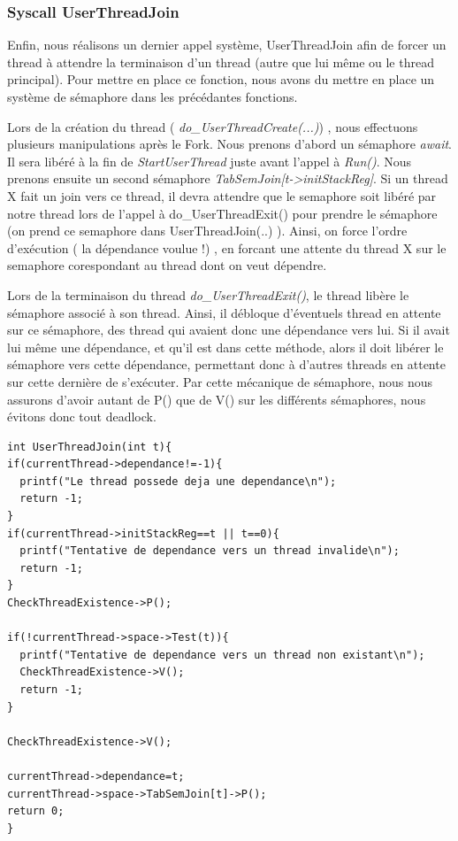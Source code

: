 \documentclass[a4paper,10pt]{article}
\begin{document}
\subsubsection{Syscall UserThreadJoin}
Enfin, nous réalisons un dernier appel système, UserThreadJoin afin de forcer un thread à attendre la terminaison d'un thread (autre que lui même ou le thread principal).
Pour mettre en place ce fonction, nous avons du mettre en place un système de sémaphore dans les précédantes fonctions.

Lors de la création du thread ( \textit{do\_UserThreadCreate(...)}) , nous effectuons plusieurs manipulations  après le Fork. Nous prenons d'abord un sémaphore \textit{await}.
Il sera libéré à la fin de \textit{StartUserThread} juste avant l'appel à \textit{Run()}. Nous prenons ensuite un second sémaphore \textit{TabSemJoin[t->initStackReg]}.
Si un thread X fait un join vers ce thread, il devra attendre que le semaphore soit libéré par notre thread lors de l'appel à do\_UserThreadExit() pour prendre le sémaphore
(on prend ce semaphore dans UserThreadJoin(..) ). Ainsi, on force l'ordre d'exécution ( la dépendance voulue !) , en forcant une attente du thread X sur le semaphore 
corespondant au thread dont on veut dépendre.

Lors de la terminaison du thread \textit{do\_UserThreadExit()}, le thread libère le sémaphore associé à son thread.
Ainsi, il débloque d'éventuels thread en attente sur ce sémaphore, des thread qui avaient donc une dépendance vers lui.
Si il avait lui même une dépendance, et qu'il est dans cette méthode, alors il doit libérer le sémaphore vers cette dépendance,
permettant donc à d'autres threads en attente sur cette dernière de s'exécuter. Par cette mécanique de sémaphore, nous nous assurons d'avoir autant de P() que de V()
sur les différents sémaphores, nous évitons donc tout deadlock.
 
\begin{lstlisting}[frame=single]
 int UserThreadJoin(int t){
if(currentThread->dependance!=-1){
  printf("Le thread possede deja une dependance\n");
  return -1;
}
if(currentThread->initStackReg==t || t==0){
  printf("Tentative de dependance vers un thread invalide\n");
  return -1;
}
CheckThreadExistence->P();

if(!currentThread->space->Test(t)){
  printf("Tentative de dependance vers un thread non existant\n");
  CheckThreadExistence->V();
  return -1;
}

CheckThreadExistence->V();

currentThread->dependance=t;
currentThread->space->TabSemJoin[t]->P();
return 0;
}
\end{lstlisting}
\newpage
\end{document}
